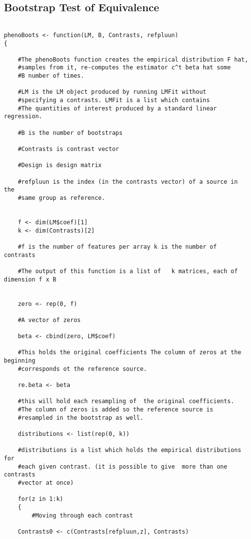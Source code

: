 \subsection{Bootstrap Test of Equivalence}


\begin{verbatim}

phenoBoots <- function(LM, B, Contrasts, refpluun)
{

	#The phenoBoots function creates the empirical distribution F hat, 
	#samples from it, re-computes the estimator c^t beta hat some 
	#B number of times.
	
	#LM is the LM object produced by running LMFit without 
	#specifying a contrasts. LMFit is a list which contains
	#The quantities of interest produced by a standard linear regression.
	
	#B is the number of bootstraps	
	
	#Contrasts is contrast vector
	
	#Design is design matrix
	
	#refpluun is the index (in the contrasts vector) of a source in the
	#same group as reference.
	
	
	f <- dim(LM$coef)[1]
	k <- dim(Contrasts)[2]

	#f is the number of features per array k is the number of contrasts
	
	#The output of this function is a list of 	k matrices, each of dimension f x B
	
	
	zero <- rep(0, f) 

	#A vector of zeros

	beta <- cbind(zero, LM$coef)

	#This holds the original coefficients The column of zeros at the beginning 
	#corresponds ot the reference source.
	
	re.beta <- beta

	#this will hold each resampling of  the original coefficients. 
	#The column of zeros is added so the reference source is 
	#resampled in the bootstrap as well.
	
	distributions <- list(rep(0, k))

	#distributions is a list which holds the empirical distributions for 
	#each given contrast. (it is possible to give  more than one contrasts 
	#vector at once)

	for(z in 1:k) 
	{
		#Moving through each contrast

	Contrasts0 <- c(Contrasts[refpluun,z], Contrasts)


\end{verbatim}
